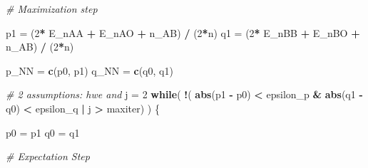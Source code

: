 \documentclass[]{article}
\newenvironment{Shaded}{\begin{snugshade}}{\end{snugshade}}
\newcommand{\KeywordTok}[1]{\textcolor[rgb]{0.13,0.29,0.53}{\textbf{#1}}}
\newcommand{\DecValTok}[1]{\textcolor[rgb]{0.00,0.00,0.81}{#1}}
\newcommand{\StringTok}[1]{\textcolor[rgb]{0.31,0.60,0.02}{#1}}
\newcommand{\CommentTok}[1]{\textcolor[rgb]{0.56,0.35,0.01}{\textit{#1}}}
\newcommand{\ControlFlowTok}[1]{\textcolor[rgb]{0.13,0.29,0.53}{\textbf{#1}}}
\newcommand{\OperatorTok}[1]{\textcolor[rgb]{0.81,0.36,0.00}{\textbf{#1}}}
\newcommand{\NormalTok}[1]{#1}
\begin{document}
\begin{Shaded}
\begin{Highlighting}[]
      \CommentTok{# Maximization step}
      
\NormalTok{      p1 =}\StringTok{ }\NormalTok{(}\DecValTok{2}\OperatorTok{*}\StringTok{ }\NormalTok{E_nAA }\OperatorTok{+}\StringTok{ }\NormalTok{E_nAO }\OperatorTok{+}\StringTok{ }\NormalTok{n_AB) }\OperatorTok{/}\StringTok{ }\NormalTok{(}\DecValTok{2}\OperatorTok{*}\NormalTok{n)}
\NormalTok{      q1 =}\StringTok{ }\NormalTok{(}\DecValTok{2}\OperatorTok{*}\StringTok{ }\NormalTok{E_nBB }\OperatorTok{+}\StringTok{ }\NormalTok{E_nBO }\OperatorTok{+}\StringTok{ }\NormalTok{n_AB) }\OperatorTok{/}\StringTok{ }\NormalTok{(}\DecValTok{2}\OperatorTok{*}\NormalTok{n)}
      
      
\NormalTok{      p_NN =}\StringTok{ }\KeywordTok{c}\NormalTok{(p0, p1)}
\NormalTok{      q_NN =}\StringTok{ }\KeywordTok{c}\NormalTok{(q0, q1)}
      
      \CommentTok{# 2 assumptions: hwe and }
\NormalTok{      j =}\StringTok{ }\DecValTok{2}
      \ControlFlowTok{while}\NormalTok{( }\OperatorTok{!}\NormalTok{( }\KeywordTok{abs}\NormalTok{(p1 }\OperatorTok{-}\StringTok{ }\NormalTok{p0) }\OperatorTok{<}\StringTok{ }\NormalTok{epsilon_p }\OperatorTok{&}\StringTok{ }\KeywordTok{abs}\NormalTok{(q1 }\OperatorTok{-}\StringTok{ }\NormalTok{q0) }\OperatorTok{<}\StringTok{ }\NormalTok{epsilon_q }\OperatorTok{|}\StringTok{ }\NormalTok{j }\OperatorTok{>}\StringTok{ }\NormalTok{maxiter) ) \{ }
        
\NormalTok{              p0 =}\StringTok{ }\NormalTok{p1}
\NormalTok{              q0 =}\StringTok{ }\NormalTok{q1}
        
              \CommentTok{# Expectation Step}
            

\end{Highlighting}
\end{Shaded}
\end{document}
